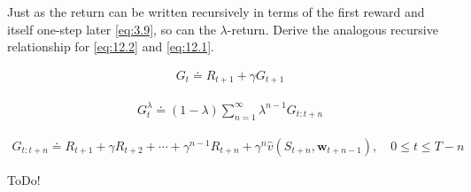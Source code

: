 
\begin{exercise}

Just as the return can be written recursively in terms of the first reward and itself one-step later \eqref{eq:3.9}, so can the $\lambda$-return.
Derive the analogous recursive relationship for \eqref{eq:12.2} and \eqref{eq:12.1}.

\begin{align} \label{eq:3.9} \tag{3.9}
    G_t
    \doteq
    R_{t+1} + \gamma G_{t+1}
\end{align}

\begin{align} \label{eq:12.2} \tag{12.2}
    G_t^\lambda
    \doteq
    (1 - \lambda)
    \sum_{n=1}^\infty
        \lambda^{n-1}
        G_{t:t+n}
\end{align}

\begin{align} \label{eq:12.1} \tag{12.1}
    G_{t:t+n}
    \doteq
    R_{t+1} + \gamma R_{t+2} + \cdots + \gamma^{n-1} R_{t+n} + \gamma^n \hat v(S_{t+n}, \mathbf w_{t+n-1}),
    \quad
    0 \leq t \leq T - n
\end{align}
\end{exercise}


\begin{solution}

ToDo!

\end{solution}

